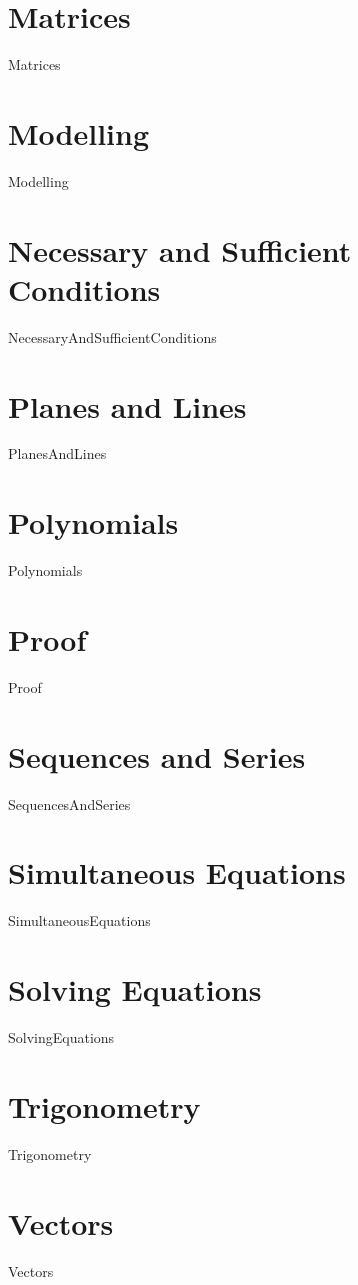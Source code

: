 \documentclass{report}
\begin{document}
	\chapter{Matrices}
	{Matrices}

	\chapter{Modelling}
	{Modelling}

	\chapter{Necessary and Sufficient Conditions}
	{NecessaryAndSufficientConditions}

	\chapter{Planes and Lines}
	{PlanesAndLines}

	\chapter{Polynomials}
	{Polynomials}

	\chapter{Proof}
	{Proof}

	\chapter{Sequences and Series}
	{SequencesAndSeries}

	\chapter{Simultaneous Equations}
	{SimultaneousEquations}

	\chapter{Solving Equations}
	{SolvingEquations}

	\chapter{Trigonometry}
	{Trigonometry}

	\chapter{Vectors}
	{Vectors}
\end{document}

